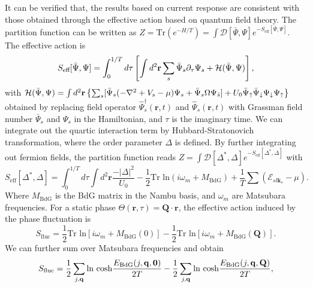 \documentclass[twocolumn,english,prl,floatfix,citeautoscript,nofootinbib]{revtex4}
\begin{document}
\begin{widetext}
It can be verified that, the results based on current response are
consistent with those obtained through the effective action based on quantum
field theory. The partition function can be written as $Z=\text{Tr}%
(e^{-H/T})=\int \mathcal{D}[\bar{\Psi},\Psi ]e^{-S_{\text{eff}}[\bar{\Psi}%
,\Psi ]}$. The effective action is
\begin{equation}
S_{\text{eff}}[\bar{\Psi},\Psi ]=\int_{0}^{1/T}d\tau \left[ \int d^{2}%
\mathbf{r}\sum_{s}\bar{\Psi}_{s}\partial _{\tau }\Psi _{s}+\mathcal{H}(\bar{%
\Psi},\Psi )\right] ,
\end{equation}%
with $\mathcal{H}(\bar{\Psi},\Psi )=\int d^{2}\mathbf{r}\left\{ \sum_{s}[%
\bar{\Psi}_{s}(-\nabla ^{2}+V_{s}-\mu)\Psi _{s}+\bar{\Psi}_{s}\Omega \Psi _{\bar{%
s}}]+U_{0}\bar{\Psi}_{\uparrow }\bar{\Psi}_{\downarrow }\Psi _{\downarrow
}\Psi _{\uparrow }\right\} $ obtained by replacing field operator $\hat{\Psi}%
_{s}^{\dag }(\mathbf{r},t)$ and $\hat{\Psi}_{s}(\mathbf{r},t)$ with Grassman
field number $\bar{\Psi}_{s}$ and $\Psi _{s}$ in the Hamiltonian, and $\tau $
is the imaginary time. We can integrate out the quartic interaction term by
Hubbard-Stratonovich transformation, where the order parameter $\Delta $ is
defined. By further integrating out fermion fields, the partition function
reads $Z=\int \mathcal{D}[\Delta ^{\ast },\Delta ]e^{-S_{\text{eff}}[\Delta
^{\ast },\Delta ]}$ with
\begin{equation}
S_{\text{eff}}[\Delta ^{\ast },\Delta ]=\int_{0}^{1/T}d\tau \int d^{2}%
\mathbf{r}\frac{-|\Delta |^{2}}{U_{0}}-\frac{1}{2}\text{Tr ln}\left( i\omega
_{m}+M_{\text{BdG}}\right) +\frac{1}{T}\sum(\mathcal{E}_{sl\mathbf{k}_{s}}-\mu ).
\end{equation}%
Where $M_{\text{BdG}}$ is the BdG matrix in the Nambu basis, and $\omega _{m}
$ are Matsubara frequencies. For a static phase $\Theta (\mathbf{r},\tau)=%
\mathbf{Q}\cdot \mathbf{r}$, the effective action induced by the phase
fluctuation is
\begin{equation}
S_{\text{fluc}}=\frac{1}{2}\text{Tr ln}[i\omega _{m}+M_{\text{BdG}%
}(0)]-\frac{1}{2}\text{Tr ln}[i\omega _{m}+M_{\text{BdG}}(\mathbf{Q})].
\end{equation}
We can
further sum over Matsubara frequencies and obtain
\begin{equation}
S_{\text{fluc}}=\frac{1}{2%
}\sum_{j,\mathbf{q}}\text{ln cosh}\frac{E_{\text{BdG}}(j,\mathbf{q,0})}{2T}-\frac{%
1}{2}\sum_{j,\mathbf{q}}\text{ln cosh}\frac{E_{\text{BdG}}(j,\mathbf{q,Q})}{2T},
\end{equation}

\end{widetext}
\end{document}
